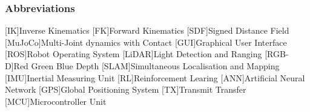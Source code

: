 \begin{Nomencl}[2.75cm]
\end{Nomencl}

\subsubsection*{Abbreviations}
    \hfill\begin{minipage}{\dimexpr\textwidth-\NomLblSep}
        \begin{acronym}[MMMMMMii]
            [IK]{Inverse Kinematics}
            [FK]{Forward Kinematics}
            [SDF]{Signed Distance Field}
            [MuJoCo]{Multi-Joint dynamics with Contact}
            [GUI]{Graphical User Interface}
            [ROS]{Robot Operating System}
            [LiDAR]{Light Detection and Ranging}
            [RGB-D]{Red Green Blue Depth}
            [SLAM]{Simultaneous Localisation and Mapping}
            [IMU]{Inertial Measuring Unit}
            [RL]{Reinforcement Learing}
            [ANN]{Artificial Neural Network}
            [GPS]{Global Positioning System}
            [TX]{Transmit Transfer}
            [MCU]{Microcontroller Unit}
        \end{acronym}       
    \end{minipage}
